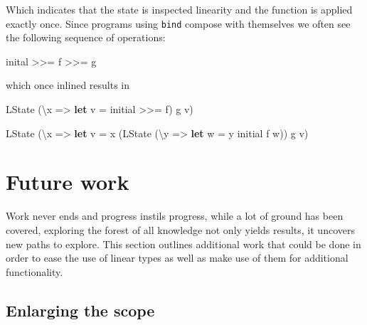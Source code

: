 \documentclass[
]{article}
\newenvironment{Shaded}{}{}
\newcommand{\DataTypeTok}[1]{\textcolor[rgb]{0.56,0.13,0.00}{#1}}
\newcommand{\KeywordTok}[1]{\textcolor[rgb]{0.00,0.44,0.13}{\textbf{#1}}}
\newcommand{\NormalTok}[1]{#1}
\newcommand{\OperatorTok}[1]{\textcolor[rgb]{0.40,0.40,0.40}{#1}}
\newcommand{\OtherTok}[1]{\textcolor[rgb]{0.00,0.44,0.13}{#1}}
\begin{document}
Which indicates that the state is inspected linearity and the function
is applied exactly once. Since programs using \texttt{bind} compose with
themselves we often see the following sequence of operations:

\begin{Shaded}
\begin{Highlighting}[]
\NormalTok{inital }\OperatorTok{\textgreater{}\textgreater{}=}\NormalTok{ f }\OperatorTok{\textgreater{}\textgreater{}=}\NormalTok{ g}
\end{Highlighting}
\end{Shaded}

which once inlined results in

\begin{Shaded}
\begin{Highlighting}[]
\DataTypeTok{LState}\NormalTok{ (\textbackslash{}x }\OtherTok{=\textgreater{}} \KeywordTok{let}\NormalTok{ v }\OtherTok{=}\NormalTok{ initial }\OperatorTok{\textgreater{}\textgreater{}=}\NormalTok{ f)}
\NormalTok{                  g v)}
\end{Highlighting}
\end{Shaded}

\begin{Shaded}
\begin{Highlighting}[]
\DataTypeTok{LState}\NormalTok{ (\textbackslash{}x }\OtherTok{=\textgreater{}} \KeywordTok{let}\NormalTok{ v }\OtherTok{=}\NormalTok{ x (}\DataTypeTok{LState}\NormalTok{ (\textbackslash{}y }\OtherTok{=\textgreater{}} \KeywordTok{let}\NormalTok{ w }\OtherTok{=}\NormalTok{ y initial }
\NormalTok{                                           f w))}
\NormalTok{                  g v)}
\end{Highlighting}
\end{Shaded}

\hypertarget{future-work}{%
\section{Future work}\label{future-work}}

Work never ends and progress instils progress, while a lot of ground has
been covered, exploring the forest of all knowledge not only yields
results, it uncovers new paths to explore. This section outlines
additional work that could be done in order to ease the use of linear
types as well as make use of them for additional functionality.

\hypertarget{enlarging-the-scope}{%
\subsection{Enlarging the scope}\label{enlarging-the-scope}}
\end{document}
